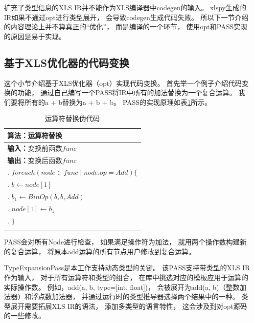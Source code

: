 扩充了类型信息的XLS IR并不能作为XLS编译器中codegen的输入。
xlspy生成的IR如果不通过opt进行类型展开，
会导致codegen生成代码失败。
所以下一节介绍的内容理论上并不算真正的“优化”，
而是编译的一个环节，
使用opt和PASS实现的原因是易于实现。

\subsection{基于XLS优化器的代码变换}

这个小节介绍基于XLS优化器（opt）实现代码变换。
首先举一个例子介绍代码变换的功能，
通过自己编写一个PASS将IR中所有的加法替换为一个复合运算。
我们要将所有的a + b替换为a + b + b。
PASS的实现原理如表\ref{alg.opreplace}所示。

\begin{table}
\begin{flushleft}
    \caption{运算符替换伪代码}
    \label{alg.opreplace}
    \begin{tabular*}{\hsize}{@{}@{\extracolsep{\fill}}l@{}}
        \Xhline{3\arrayrulewidth}
        \;\textbf{算法：}运算符替换 \\
        \hline

        \;\textbf{输入：}$\text{变换前函数}func$ \\
        \;\textbf{输出：}$\text{变换后函数}func$ \\
        \;1. $foreach(node \in func \mid node.op = Add) \{$ \\
        \;2. \quad$b \gets node[1]$ \\
        \;3. \quad$b_1 \gets BinOp(b, b, Add)$ \\
        \;4. \quad$node[1] \gets b_1$ \\
        \;5. $\}$ \\

        \Xhline{3\arrayrulewidth}
    \end{tabular*}
\end{flushleft}
\end{table}

PASS会对所有Node进行检查，
如果满足操作符为加法，
就用两个操作数构建新的复合运算，
将原本add运算的所有节点用户修改到复合运算。

TypeExpansionPass是本工作支持动态类型的关键。
该PASS支持带类型的XLS IR作为输入，
对于所有运算符和类型的组合，
在库中挑选对应的模板应用于运算的实际操作数。
例如，add(a, b, type=[int, float])，
会被展开为add(a, b)（整数加法器）和浮点数加法器，
并通过运行时的类型推导器选择两个结果中的一种。
类型展开需要拓展XLS IR的语法，
添加多类型的语言特性，
这会涉及到对opt源码的一些修改。

